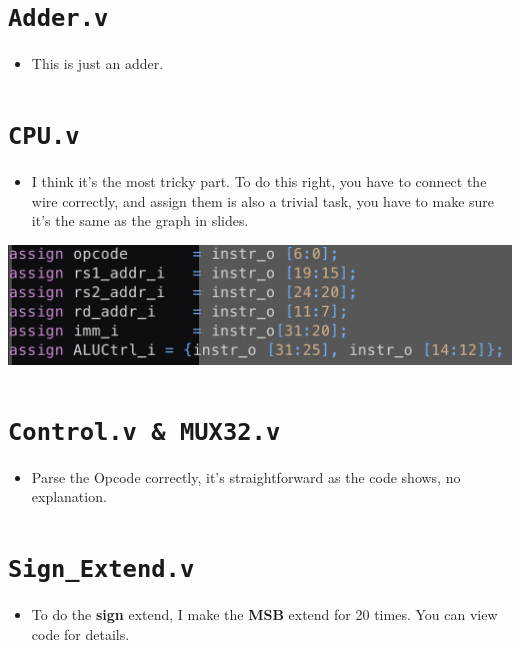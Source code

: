 \documentclass[12pt]{article}
\begin{document}
\section*{\texttt{Adder.v}}
\begin{itemize}
	\item This is just an adder.
\end{itemize}

\section*{\texttt{CPU.v}}
\begin{itemize}
	\item I think it's the most tricky part. To do this right, you have to connect the wire correctly, and assign them is also a trivial task, you have to make sure it's the same as the graph in slides.
\end{itemize}
{
	\centering
	\includegraphics[width=\textwidth]{./img/CPU_code.png}
}

\section*{\texttt{Control.v \& MUX32.v}}
\begin{itemize}
	\item Parse the Opcode correctly, it's straightforward as the code shows, no explanation.
\end{itemize}

\section*{\texttt{Sign\_Extend.v}}
\begin{itemize}
	\item To do the \textbf{sign} extend, I make the \textbf{MSB} extend for 20 times. You can view code for details.
\end{itemize}
\end{document}
